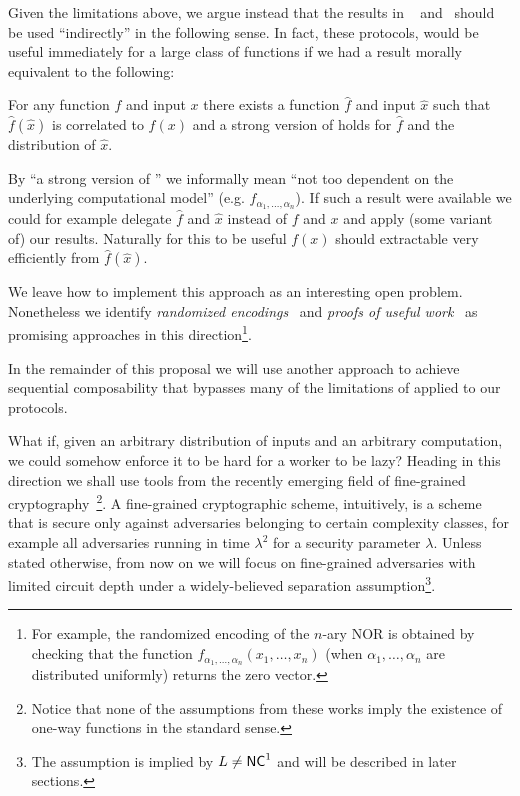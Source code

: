 Given the limitations above, we argue instead that the results in ~\cite{cg15} and~\cite{cg17} should be used ``indirectly'' in the following sense. In fact, these protocols, would be useful immediately for a large class of functions if we had a result morally equivalent to the following:
\begin{displayquote}
For any function $f$ and input $x$ there exists a function $\hat{f}$ and input $\hat{x}$ such that  $\hat{f}(\hat{x})$ is correlated to $f(x)$ and a strong version of \NoFLAVA  holds for $\hat{f}$ and the distribution of $\hat{x}$.
\end{displayquote}
By ``a strong version of \NoFLAVA'' we informally mean ``not too dependent on the underlying computational model'' (e.g. $f_{\alpha_1,\dots,\alpha_n}$).
If such a result were available we could for example delegate $\hat{f}$ and $\hat{x}$ instead of $f$ and $x$ and apply (some variant of) our results.
Naturally for this to be useful $f(x)$ should extractable very efficiently from $\hat{f}(\hat{x})$.

We leave how to implement this approach as an interesting open problem. Nonetheless we identify \textit{randomized encodings}~\cite{re} and \textit{proofs of useful work}~\cite{ball2017proofs}
as promising approaches in this direction\footnote{For example, the randomized encoding of the $n$-ary NOR is obtained by checking that the function $f_{\alpha_1,\dots,\alpha_n}(x_1,\dots,x_n)$ (when $\alpha_1,\dots,\alpha_n$ are distributed uniformly) returns the zero vector.}.

In the remainder of this proposal we  will use another approach to achieve sequential composability that bypasses many of the limitations of \NoFLAVA applied to our protocols.


What if, given an arbitrary distribution of inputs and an arbitrary computation, we could somehow enforce it to be hard for a worker to be lazy? Heading in this direction we shall use tools from the recently emerging field of fine-grained cryptography~\cite{fgcrypto}\footnote{Notice that none of the assumptions from these works imply the existence of one-way functions in the standard sense.}. A fine-grained cryptographic scheme, intuitively, is a scheme that is secure only against adversaries belonging to certain complexity classes, for example all adversaries running in time $\lambda^2$ for a security parameter $\lambda$. Unless stated otherwise, from now on we will focus on fine-grained adversaries with limited circuit depth under a widely-believed separation assumption\footnote{The assumption is implied by $L \not = {\mathsf{NC}}^1$ and will be described in later sections.}.

